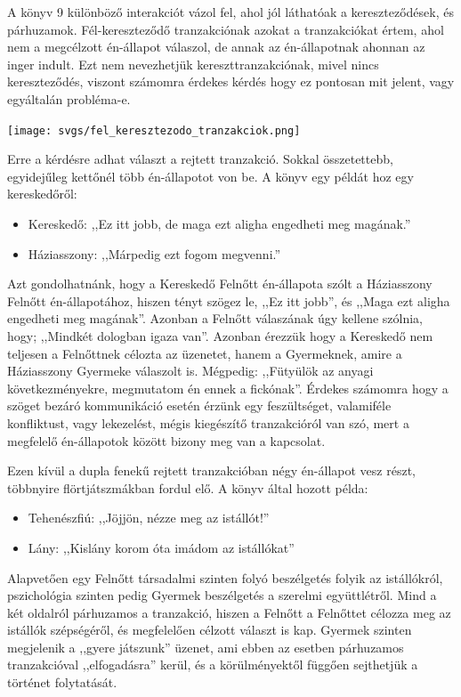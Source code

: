\documentclass[a4paper,12pt]{article}
\begin{document}
	A könyv 9 különböző interakciót vázol fel, ahol jól láthatóak a kereszteződések, és párhuzamok. Fél-kereszteződő tranzakciónak azokat a tranzakciókat értem, ahol nem a megcélzott én-állapot válaszol, de annak az én-állapotnak ahonnan az inger indult. Ezt nem nevezhetjük kereszttranzakciónak, mivel nincs kereszteződés, viszont számomra érdekes kérdés hogy ez pontosan mit jelent, vagy egyáltalán probléma-e. \\[0.3cm]
	\begin{center}
		\texttt{[image: svgs/fel\_keresztezodo\_tranzakciok.png]} \\[0.8cm]
	\end{center}
	Erre a kérdésre adhat választ a rejtett tranzakció. Sokkal összetettebb, egyidejűleg kettőnél több én-állapotot von be. A könyv egy példát hoz egy kereskedőről:
	\begin{itemize}
		\item Kereskedő: ,,Ez itt jobb, de maga ezt aligha engedheti meg magának.''
		\item Háziasszony: ,,Márpedig ezt fogom megvenni.''
	\end{itemize}
	Azt gondolhatnánk, hogy a Kereskedő Felnőtt én-állapota szólt a Háziasszony Felnőtt én-állapotához, hiszen tényt szögez le, ,,Ez itt jobb'', és ,,Maga ezt aligha engedheti meg magának''. Azonban a Felnőtt válaszának úgy kellene szólnia, hogy; ,,Mindkét dologban igaza van''.
	Azonban érezzük hogy a Kereskedő nem teljesen a Felnőttnek célozta az üzenetet, hanem a Gyermeknek, amire a Háziasszony Gyermeke válaszolt is. Mégpedig: ,,Fütyülök az anyagi következményekre, megmutatom én ennek a fickónak''.
	Érdekes számomra hogy a szöget bezáró kommunikáció esetén érzünk egy feszültséget, valamiféle konfliktust, vagy lekezelést, mégis kiegészítő tranzakcióról van szó, mert a megfelelő én-állapotok között bizony meg van a kapcsolat.
	
	Ezen kívül a dupla fenekű rejtett tranzakcióban négy én-állapot vesz részt, többnyire flörtjátszmákban fordul elő. A könyv által hozott példa:
	\begin{itemize}
		\item Tehenészfiú: ,,Jöjjön, nézze meg az istállót!''
		\item Lány: ,,Kislány korom óta imádom az istállókat''
	\end{itemize}
	Alapvetően egy Felnőtt társadalmi szinten folyó beszélgetés folyik az istállókról, pszichológia szinten pedig Gyermek beszélgetés a szerelmi együttlétről. Mind a két oldalról párhuzamos a tranzakció, hiszen a Felnőtt a Felnőttet célozza meg az istállók szépségéről, és megfelelően célzott választ is kap. Gyermek szinten megjelenik a ,,gyere játszunk'' üzenet, ami ebben az esetben párhuzamos tranzakcióval ,,elfogadásra'' kerül, és a körülményektől függően sejthetjük a történet folytatását.
	
\end{document}
